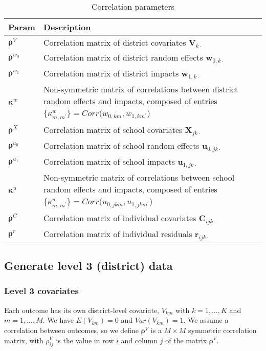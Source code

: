 \documentclass[12pt]{article}
\newcommand\mb[1]{\boldsymbol{#1}}
\begin{document}
\begin{table}[ht!]
\begin{tabular}{p{1.5cm} | p{15cm}}
Param											& Description \\ \hline
$\mb{\rho}^V$									& Correlation matrix of district covariates $\mb{V}_{k\cdot}$ \\
$\mb{\rho}^{w_0}$								& Correlation matrix of district random effects $\mb{w}_{0,k\cdot}$ \\
$\mb{\rho}^{w_1}$								& Correlation matrix of district impacts $\mb{w}_{1,k\cdot}$\\
$\boldsymbol{\kappa}^{w}$						& Non-symmetric matrix of correlations between district random effects and impacts, composed of entries $\{\kappa_{m,m^\prime}^{w}\} = Corr(w_{0,km}, w_{1,km^\prime}$) \\ \hline
$\mb{\rho}^X$									& Correlation matrix of school covariates $\mb{X}_{jk\cdot}$\\
$\mb{\rho}^{u_0}$								& Correlation matrix of school random effects $\mb{u}_{0,jk\cdot}$\\
$\mb{\rho}^{u_1}$								& Correlation matrix of school impacts $\mb{u}_{1,jk\cdot}$\\
$\boldsymbol{\kappa}^{u}$						& Non-symmetric matrix of correlations between school random effects and impacts, composed of entries $\{\kappa_{m,m^\prime}^{u}\} = Corr(u_{0,jkm}, u_{1,jkm^\prime}$) \\ \hline
$\mb{\rho}^C$									& Correlation matrix of individual covariates $\mb{C}_{ijk\cdot}$\\
$\mb{\rho}^r$									& Correlation matrix of individual residuals $\mb{r}_{ijk\cdot}$
\end{tabular}
\label{tab:corr_param}
\caption{Correlation parameters}
\end{table}


\subsection{Generate level 3 (district) data}

\subsubsection{Level 3 covariates}

Each outcome has its own district-level covariate, $V_{km}$ with $k = 1, \ldots, K$ and $m = 1, \ldots, M$.
We have $E(V_{km}) = 0$ and $Var(V_{km}) = 1$.
We assume a correlation between outcomes, so we define $\mb{\rho}^V$ is a $M \times M$ symmetric correlation matrix, with $\rho^V_{ij}$ is the value in row $i$ and column $j$ of the matrix $\mb{\rho}^V$.
\end{document}
